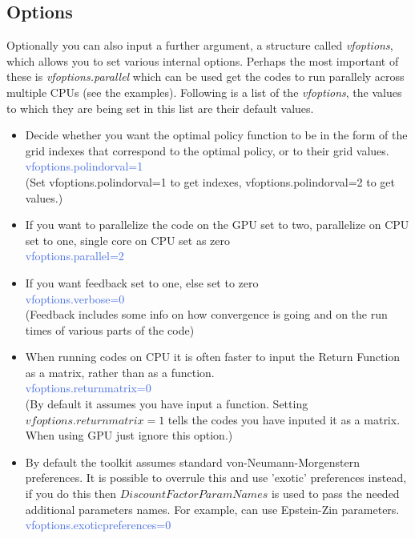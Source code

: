 \subsection{Options}
Optionally you can also input a further argument, a structure called \textit{vfoptions}, which allows you to set various internal options. Perhaps
the most important of these is \textit{vfoptions.parallel} which can be used get the codes to run parallely across multiple CPUs (see the examples).
Following is a list of the \textit{vfoptions}, the values to which they are being set in this list are their default values.
 \begin{itemize}
  \item Decide whether you want the optimal policy function to be in the form of the grid indexes that correspond to the optimal policy, or to their grid values. \\
    \textcolor{RoyalBlue}{vfoptions.polindorval=1} \\
      (Set vfoptions.polindorval=1 to get indexes, vfoptions.polindorval=2 to get values.)
  \item If you want to parallelize the code on the GPU set to two, parallelize on CPU set to one, single core on CPU set as zero \\
    \textcolor{RoyalBlue}{vfoptions.parallel=2}
  \item If you want feedback set to one, else set to zero \\
    \textcolor{RoyalBlue}{vfoptions.verbose=0} \\
      (Feedback includes some info on how convergence is going and on the run times of various parts of the code)
  \item When running codes on CPU it is often faster to input the Return Function as a matrix, rather than as a function. \\
    \textcolor{RoyalBlue}{vfoptions.returnmatrix=0} \\
    (By default it assumes you have input a function. Setting $vfoptions.returnmatrix=1$ tells the codes you have inputed it as a matrix. When using GPU just ignore this option.)
  \item By default the toolkit assumes standard von-Neumann-Morgenstern preferences. It is possible to overrule this and use 'exotic' preferences instead, if you do this then $DiscountFactorParamNames$ is
    used to pass the needed additional parameters names. For example, can use Epstein-Zin parameters. \\
    \textcolor{RoyalBlue}{vfoptions.exoticpreferences=0}

\end{itemize}
